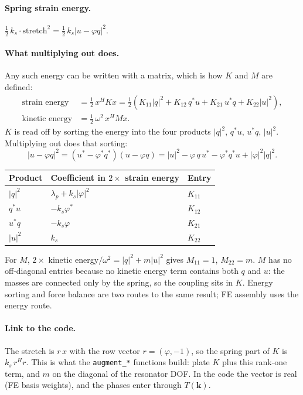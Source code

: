 \paragraph{Spring strain energy.} $\tfrac12\, k_s\cdot\text{stretch}^2 = \tfrac12\, k_s|u - \varphi q|^2$.

\paragraph{What multiplying out does.}
Any such energy can be written with a matrix, which is how $K$ and $M$ are
defined:
\begin{align}
  \text{strain energy} &= \tfrac12\, x^H K x = \tfrac12\left(K_{11}|q|^2 + K_{12}\,q^* u + K_{21}\,u^* q + K_{22}|u|^2\right), \\
  \text{kinetic energy} &= \tfrac12\,\omega^2\, x^H M x .
\end{align}
$K$ is read off by sorting the energy into the four products $|q|^2$, $q^*u$,
$u^*q$, $|u|^2$. Multiplying out does that sorting:
\begin{equation}
  |u - \varphi q|^2 = (u^* - \varphi^* q^*)(u - \varphi q)
  = |u|^2 - \varphi\, q\, u^* - \varphi^* q^* u + |\varphi|^2 |q|^2 .
\end{equation}
\begin{center}
\begin{tabular}{|l|l|l|}
\hline
Product & Coefficient in $2\times$ strain energy & Entry \\
\hline
$|q|^2$ & $\lambda_p + k_s|\varphi|^2$ & $K_{11}$ \\
$q^* u$ & $-k_s\varphi^*$ & $K_{12}$ \\
$u^* q$ & $-k_s\varphi$ & $K_{21}$ \\
$|u|^2$ & $k_s$ & $K_{22}$ \\
\hline
\end{tabular}
\end{center}
For $M$, $2\times$ kinetic energy$/\omega^2 = |q|^2 + m|u|^2$ gives
$M_{11} = 1$, $M_{22} = m$. $M$ has no off-diagonal entries because no kinetic
energy term contains both $q$ and $u$: the masses are connected only by the
spring, so the coupling sits in $K$. Energy sorting and force balance are two
routes to the same result; FE assembly uses the energy route.

\paragraph{Link to the code.}
The stretch is $r\,x$ with the row vector $r = (\varphi, -1)$, so the spring
part of $K$ is $k_s\, r^H r$. This is what the \texttt{augment\_*} functions
build: plate $K$ plus this rank-one term, and $m$ on the diagonal of the
resonator DOF. In the code the vector is real (FE basis weights), and the
phases enter through $T(\mathbf{k})$.

